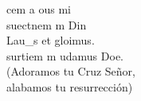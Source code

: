 \begin{cancion}%
	cem a  ous mi\\
	suectnem m Din\\
	Lau_s et gloimus.\\
	surtiem m udamus Doe.\\
(Adoramos tu Cruz Señor,\\
 alabamos tu resurrección)\\
\end{cancion}%
